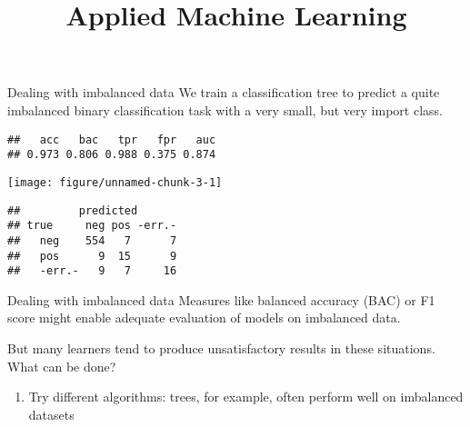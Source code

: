 \documentclass[11pt,compress,t,notes=noshow, aspectratio=169, xcolor=table]{beamer}
\title{Applied Machine Learning}
\date{}
\begin{document}
\newcommand{\titlefigure}{figure/empty}
\newcommand{\learninggoals}{
\item old material
\item also check \textbf{imbalanced-learning} slides in \textbf{lecture\_advml} repo}



\begin{frame}[fragile]{Dealing with imbalanced data}
\label{dealing-with-imbalanced-data}
We train a classification tree to predict a quite imbalanced binary
classification task with a very small, but very import class.

\scriptsize

\begin{verbatim}
##   acc   bac   tpr   fpr   auc 
## 0.973 0.806 0.988 0.375 0.874
\end{verbatim}

\begin{center}\texttt{[image: figure/unnamed-chunk-3-1]} \end{center}

\begin{verbatim}
##         predicted
## true     neg pos -err.-
##   neg    554   7      7
##   pos      9  15      9
##   -err.-   9   7     16
\end{verbatim}

\normalsize
\end{frame}

\begin{frame}{Dealing with imbalanced data}
\label{dealing-with-imbalanced-data-1}
Measures like balanced accuracy (BAC) or F1 score might enable adequate
evaluation of models on imbalanced data.

But many learners tend to produce unsatisfactory results in these
situations. What can be done?

\begin{enumerate}
\tightlist
\item
  Try different algorithms: trees, for example, often perform well on
  imbalanced datasets
\end{enumerate}
\end{frame}
\end{document}

